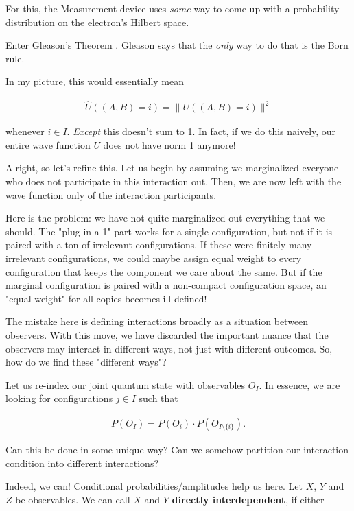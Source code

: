 \documentclass{article}
\begin{document}
For this, the Measurement device uses \textit{some} way to come up with a probability distribution on the electron's Hilbert space.

Enter Gleason's Theorem \cite{Gleason1957}. Gleason says that the \textit{only} way to do that is the Born rule.

In my picture, this would essentially mean

\begin{align*}
\widehat{U}((A,B) = i) = \|U((A,B) = i)\|^2
\end{align*}

whenever $i\in I$. \textit{Except} this doesn't sum to 1. In fact, if we do this naively, our entire wave function $U$ does not have norm 1 anymore!

Alright, so let's refine this. Let us begin by assuming we marginalized everyone who does not participate in this interaction out. Then, we are now left with the wave function only of the interaction participants.

Here is the problem: we have not quite marginalized out everything that we should. The "plug in a 1" part works for a single configuration, but not if it is paired with a ton of irrelevant configurations. If these were finitely many irrelevant configurations, we could maybe assign equal weight to every configuration that keeps the component we care about the same. But if the marginal configuration is paired with a non-compact configuration space, an "equal weight" for all copies becomes ill-defined! 

The mistake here is defining interactions broadly as a situation between observers. With this move, we have discarded the important nuance that the observers may interact in different ways, not just with different outcomes. So, how do we find these "different ways"?

Let us re-index our joint quantum state with observables $O_I$. In essence, we are looking for configurations $j\in I$ such that

\begin{align*}
P(O_I) = P(O_i) \cdot P(O_{I\setminus\lbrace i\rbrace}).
\end{align*}

Can this be done in some unique way? Can we somehow partition our interaction condition into different interactions?

Indeed, we can! Conditional probabilities/amplitudes help us here. Let $X$, $Y$ and $Z$ be observables. We can call $X$ and $Y$ \textbf{directly interdependent}, if either
\end{document}
